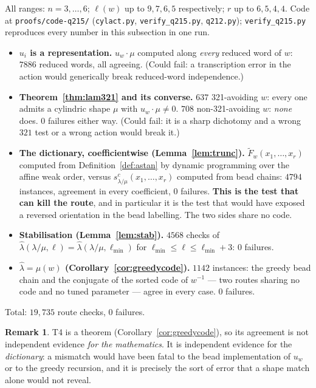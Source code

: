 \documentclass[11pt]{article}
\theoremstyle{plain}
\theoremstyle{definition}
\newtheorem{rem}[thm]{Remark}
\newcommand{\Fw}{\widetilde{F}_{w}}
\begin{document}
All ranges: $n=3,\dots,6$; $\ell(w)$ up to $9,7,6,5$ respectively; $r$ up to $6,5,4,4$. Code at
\texttt{proofs/code-q215/} (\texttt{cylact.py}, \texttt{verify\_q215.py}, \texttt{q212.py});
\texttt{verify\_q215.py} reproduces every number in this subsection in one run.

\begin{itemize}
\item[\textbf{T0}] \textbf{$u_i$ is a representation.} $u_w\cdot\mu$ computed along \emph{every}
reduced word of $w$: $7886$ reduced words, all agreeing. (Could fail: a transcription error in
the action would generically break reduced-word independence.)
\item[\textbf{T1}] \textbf{Theorem~\ref{thm:lam321} and its converse.} $637$ 321-avoiding $w$:
every one admits a cylindric shape $\mu$ with $u_w\cdot\mu\ne0$. $708$ non-321-avoiding $w$:
\emph{none} does. $0$ failures either way. (Could fail: it is a sharp dichotomy and a wrong
$321$ test or a wrong action would break it.)
\item[\textbf{T2}] \textbf{The dictionary, coefficientwise (Lemma~\ref{lem:trunc}).}
$\Fw(x_1,\dots,x_r)$ computed from Definition~\ref{def:astan} by dynamic programming over the
affine weak order, versus $s^{c}_{\lambda/\mu}(x_1,\dots,x_r)$ computed from bead chains: $4794$
instances, agreement in every coefficient, $0$ failures. \textbf{This is the test that can kill
the route}, and in particular it is the test that would have exposed a reversed orientation in
the bead labelling. The two sides share no code.
\item[\textbf{T3}] \textbf{Stabilisation (Lemma~\ref{lem:stab}).} $4568$ checks of
$\hat\lambda(\lambda/\mu,\ell)=\hat\lambda(\lambda/\mu,\ell_{\min})$ for
$\ell_{\min}\le\ell\le\ell_{\min}+3$: $0$ failures.
\item[\textbf{T4}] \textbf{$\hat\lambda=\mu(w)$ (Corollary~\ref{cor:greedycode}).} $1142$
instances: the greedy bead chain and the conjugate of the sorted code of $w^{-1}$ --- two
routes sharing no code and no tuned parameter --- agree in every case. $0$ failures.
\end{itemize}

Total: $19{,}735$ route checks, $0$ failures.

\begin{rem}
T4 is a theorem (Corollary~\ref{cor:greedycode}), so its agreement is not independent evidence
\emph{for the mathematics}. It is independent evidence for the \emph{dictionary}: a mismatch
would have been fatal to the bead implementation of $u_w$ or to the greedy recursion, and it
is precisely the sort of error that a shape match alone would not reveal.
\end{rem}
\end{document}
